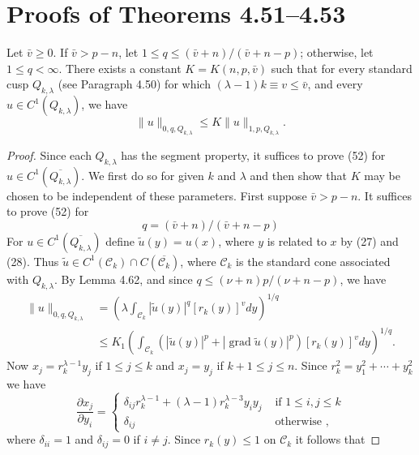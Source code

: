 \section{Proofs of Theorems 4.51--4.53}


\begin{lemma}
  Let $\bar{v} \geq 0$. If $\bar{v}>p-n$, let $1 \leq q \leq(\bar{v}+n) /(\bar{v}+n-p)$; otherwise, let $1 \leq q<\infty$. There exists a constant $K=K(n, p, \bar{v})$ such that for every standard cusp $Q_{k, \lambda}$ (see Paragraph 4.50) for which $(\lambda-1) k \equiv v \leq \bar{v}$, and every $u \in C^1\left(Q_{k, \lambda}\right)$, we have
  \[
  \|u\|_{0, q, Q_{k, \lambda}} \leq K\|u\|_{1, p, Q_{k, \lambda}} .
  \]
\end{lemma}

\begin{proof}
  Since each $Q_{k, \lambda}$ has the segment property, it suffices to prove (52) for $u \in C^1\left(\overline{Q_{k, \lambda}}\right)$. We first do so for given $k$ and $\lambda$ and then show that $K$ may be chosen to be independent of these parameters.
  First suppose $\bar{v}>p-n$. It suffices to prove (52) for
  \[
  q=(\bar{v}+n) /(\bar{v}+n-p)
  \]
  For $u \in C^1\left(\overline{Q_{k, \lambda}}\right)$ define $\tilde{u}(y)=u(x)$, where $y$ is related to $x$ by (27) and (28). Thus $\tilde{u} \in C^1\left(\mathcal{C}_k\right) \cap C\left(\overline{\mathcal{C}_k}\right)$, where $\mathcal{C}_k$ is the standard cone associated with $Q_{k, \lambda}$. By Lemma 4.62, and since $q \leq(\nu+n) p /(\nu+n-p)$, we have
  \[
  \begin{aligned}
  \|u\|_{0, q, Q_{k, \lambda}} & =\left(\lambda \int_{\mathcal{C}_k}|\tilde{u}(y)|^q\left[r_k(y)\right]^v d y\right)^{1 / q} \\
  & \leq K_1\left(\int_{\mathcal{C}_k}\left(|\tilde{u}(y)|^p+|\operatorname{grad} \tilde{u}(y)|^p\right)\left[r_k(y)\right]^v d y\right)^{1 / q} .
  \end{aligned}
  \]
  Now $x_j=r_k^{\lambda-1} y_j$ if $1 \leq j \leq k$ and $x_j=y_j$ if $k+1 \leq j \leq n$. Since $r_k^2=y_1^2+\cdots+y_k^2$ we have
  \[
  \frac{\partial x_j}{\partial y_i}= \begin{cases}\delta_{i j} r_k^{\lambda-1}+(\lambda-1) r_k^{\lambda-3} y_i y_j & \text { if } 1 \leq i, j \leq k \\ \delta_{i j} & \text { otherwise },\end{cases}
  \]
  where $\delta_{i i}=1$ and $\delta_{i j}=0$ if $i \neq j$. Since $r_k(y) \leq 1$ on $\mathcal{C}_k$ it follows that

\end{proof}
